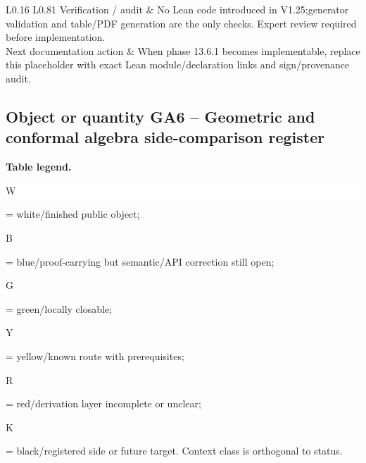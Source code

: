 \begin{longtable}{L{0.16\linewidth} L{0.81\linewidth}}
\hline\addlinespace[0.20em]
Verification /\allowbreak{} audit & No Lean code introduced in V1.25;\newline generator validation and table/\allowbreak{}PDF generation are the only checks. Expert review required before implementation.\\
\hline\addlinespace[0.20em]
Next documentation action & When phase 13.6.1 becomes implementable, replace this placeholder with exact Lean module/\allowbreak{}declaration links and sign/\allowbreak{}provenance audit.\\
\hline\addlinespace[0.20em]
\end{longtable}
\subsection*{Object or quantity GA6 -- Geometric and conformal algebra side-comparison register}
\hypertarget{objproof:GA6}{}
\par\smallskip\noindent\begin{minipage}{0.99\linewidth}\footnotesize\raggedright\textbf{Table legend.} \colorbox{white}{\strut W} = white/finished public object; \colorbox{cyan!20}{\strut B} = blue/proof-carrying but semantic/API correction still open; \colorbox{green!18}{\strut G} = green/locally closable; \colorbox{yellow!25}{\strut Y} = yellow/known route with prerequisites; \colorbox{red!20}{\strut R} = red/derivation layer incomplete or unclear; \colorbox{black!18}{\strut K} = black/registered side or future target. Context class is orthogonal to status.\end{minipage}\par\vspace{0.25em}
